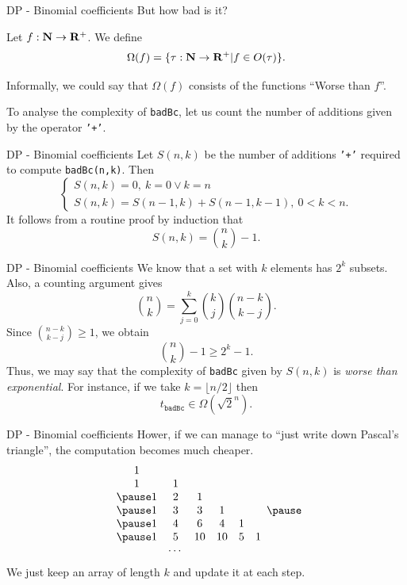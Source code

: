 \documentclass{beamer}
\begin{document}
%

\begin{frame}{DP - Binomial coefficients}
	But how bad is it?
	\begin{defn}
		Let $f : \mathbf{N} \to \mathbf{R}^+$. We define
		\[
			\Omega(f)= \{\tau : \mathbf{N} \to \mathbf{R}^+ | f \in O(\tau)\}.
		\]
	\end{defn}
	Informally, we could say that $\Omega(f)$ consists of the functions
	``Worse than $f$''.

	\bigskip
	To analyse the complexity of \texttt{badBc}, let us count the number of
	additions given by the operator \texttt{'+'}.
\end{frame}

%

\begin{frame}{DP - Binomial coefficients}
	Let $S(n,k)$ be the number of additions \texttt{'+'} required to compute
	\texttt{badBc(n,k)}. Then
	\[
		\begin{cases}
			S(n,k) = 0,\ k = 0 \lor k = n\\
			S(n,k) = S(n-1,k) + S(n-1,k-1),\ 0 < k < n.
		\end{cases}
	\]
	It follows from a routine proof by induction that
		\[
			S(n,k) = \binom{n}{k} - 1.
		\] 
\end{frame}

%

\begin{frame}{DP - Binomial coefficients}
	We know that a set with $k$ elements has $2^k$ subsets. Also, a counting
	argument gives
	\[
		\binom{n}{k} = \sum_{j= 0}^k \binom{k}{j} \binom{n-k}{k-j}.
	\]
	Since $\binom{n-k}{k-j} \geq 1$, we obtain
	\[
		\binom{n}{k} - 1 \geq 2^k - 1.
	\]
	Thus, we may say that the complexity of \texttt{badBc} given by $S(n,k)$ is
	\emph{worse than exponential}. For instance, if we take $k= \lfloor n/2
	\rfloor$ then 
	\[
		t_{\texttt{badBc}} \in \Omega(\sqrt{2}^n).
	\]
\end{frame}

%

\begin{frame}{DP - Binomial coefficients}
	Hower, if we can manage to ``just write down Pascal's triangle'', the
	computation becomes much cheaper.
	\[
		\begin{array}{cccccc}
			1 & & & & & \\
			1 & 1 & & & & \\ \pause
			1 & 2 & 1 & & & \\ \pause
			1 & 3 & 3 & 1 & & \\ \pause
			1 & 4 & 6 & 4 & 1 & \\ \pause
			1 & 5 & 10 & 10 & 5 & 1\\
			 & \cdots & & & & 
		\end{array}\pause
	\]
	We just keep an array of length $k$ and update it at each step.
\end{frame}
\end{document}
